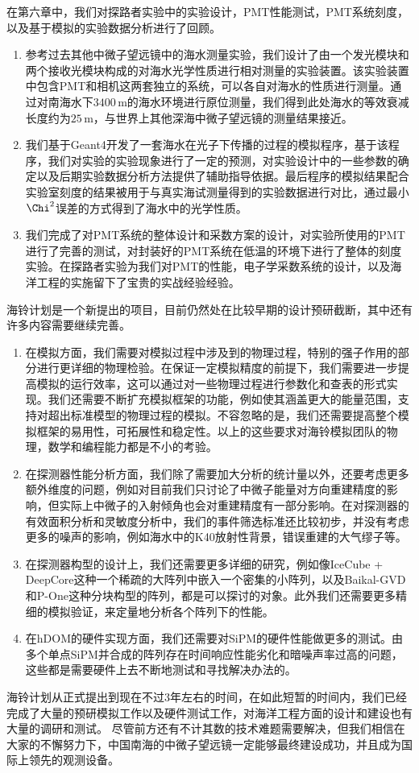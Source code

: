 在第六章中，我们对探路者实验中的实验设计，PMT性能测试，PMT系统刻度，以及基于模拟的实验数据分析进行了回顾。
\begin{enumerate}
    \item 参考过去其他中微子望远镜中的海水测量实验，我们设计了由一个发光模块和两个接收光模块构成的对海水光学性质进行相对测量的实验装置。该实验装置中包含PMT和相机这两套独立的系统，可以各自对海水的性质进行测量。通过对南海水下$3400\,\mathrm{m}$的海水环境进行原位测量，我们得到此处海水的等效衰减长度约为$25\,\mathrm{m}$，与世界上其他深海中微子望远镜的测量结果接近。
    \item 我们基于Geant4开发了一套海水在光子下传播的过程的模拟程序，基于该程序，我们对实验的实验现象进行了一定的预测，对实验设计中的一些参数的确定以及后期实验数据分析方法提供了辅助指导依据。最后程序的模拟结果配合实验室刻度的结果被用于与真实海试测量得到的实验数据进行对比，通过最小$\Chi^2$误差的方式得到了海水中的光学性质。
    \item 我们完成了对PMT系统的整体设计和采数方案的设计，对实验所使用的PMT进行了完善的测试，对封装好的PMT系统在低温的环境下进行了整体的刻度实验。在探路者实验为我们对PMT的性能，电子学采数系统的设计，以及海洋工程的实施留下了宝贵的实战经验经验。
\end{enumerate}

海铃计划是一个新提出的项目，目前仍然处在比较早期的设计预研截断，其中还有许多内容需要继续完善。
\begin{enumerate}
    \item 在模拟方面，我们需要对模拟过程中涉及到的物理过程，特别的强子作用的部分进行更详细的物理检验。在保证一定模拟精度的前提下，我们需要进一步提高模拟的运行效率，这可以通过对一些物理过程进行参数化和查表的形式实现。我们还需要不断扩充模拟框架的功能，例如使其涵盖更大的能量范围，支持对超出标准模型的物理过程的模拟。不容忽略的是，我们还需要提高整个模拟框架的易用性，可拓展性和稳定性。以上的这些要求对海铃模拟团队的物理，数学和编程能力都是不小的考验。
    \item 在探测器性能分析方面，我们除了需要加大分析的统计量以外，还要考虑更多额外维度的问题，例如对目前我们只讨论了中微子能量对方向重建精度的影响，但实际上中微子的入射倾角也会对重建精度有一部分影响。在对探测器的有效面积分析和灵敏度分析中，我们的事件筛选标准还比较初步，并没有考虑更多的噪声的影响，例如海水中的K40放射性背景，错误重建的大气缪子等。
    \item 在探测器构型的设计上，我们还需要更多详细的研究，例如像IceCube + DeepCore\cite{IceCube_deepcore:2011}这种一个稀疏的大阵列中嵌入一个密集的小阵列，以及Baikal-GVD\cite{BAIKAL_design:1997}和P-One\cite{P-ONE:2020}这种分块构型的阵列，都是可以探讨的对象。此外我们还需要更多精细的模拟验证，来定量地分析各个阵列下的性能。
    \item 在hDOM的硬件实现方面，我们还需要对SiPM的硬件性能做更多的测试。由多个单点SiPM并合成的阵列存在时间响应性能劣化和暗噪声率过高的问题，这些都是需要硬件上去不断地测试和寻找解决办法的。
\end{enumerate}

海铃计划从正式提出到现在不过3年左右的时间，在如此短暂的时间内，我们已经完成了大量的预研模拟工作以及硬件测试工作，对海洋工程方面的设计和建设也有大量的调研和测试。
尽管前方还有不计其数的技术难题需要解决，但我们相信在大家的不懈努力下，中国南海的中微子望远镜一定能够最终建设成功，并且成为国际上领先的观测设备。